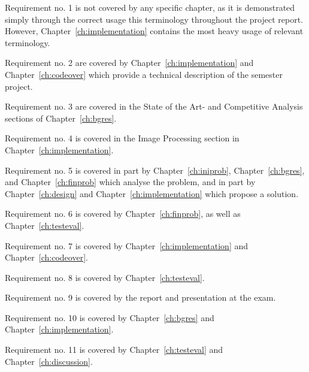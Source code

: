 Requirement no. 1 is not covered by any specific chapter, as it is demonstrated simply through the correct usage this terminology throughout the project report. However, Chapter~\ref{ch:implementation} contains the most heavy usage of relevant terminology.

Requirement no. 2 are covered by Chapter~\ref{ch:implementation} and Chapter~\ref{ch:codeover} which provide a technical description of the semester project.

Requirement no. 3 are covered in the State of the Art- and Competitive Analysis sections of Chapter~\ref{ch:bgres}.

Requirement no. 4 is covered in the Image Processing section in Chapter~\ref{ch:implementation}.

Requirement no. 5 is covered in part by Chapter~\ref{ch:iniprob}, Chapter~\ref{ch:bgres}, and Chapter~\ref{ch:finprob} which analyse the problem, and in part by Chapter~\ref{ch:design} and Chapter~\ref{ch:implementation} which propose a solution.

Requirement no. 6 is covered by Chapter~\ref{ch:finprob}, as well as Chapter~\ref{ch:testeval}.

Requirement no. 7 is covered by Chapter~\ref{ch:implementation} and Chapter~\ref{ch:codeover}.

Requirement no. 8 is covered by Chapter~\ref{ch:testeval}.

Requirement no. 9 is covered by the report and presentation at the exam.

Requirement no. 10 is covered by Chapter~\ref{ch:bgres} and Chapter~\ref{ch:implementation}.

Requirement no. 11 is covered by Chapter~\ref{ch:testeval} and Chapter~\ref{ch:discussion}.
